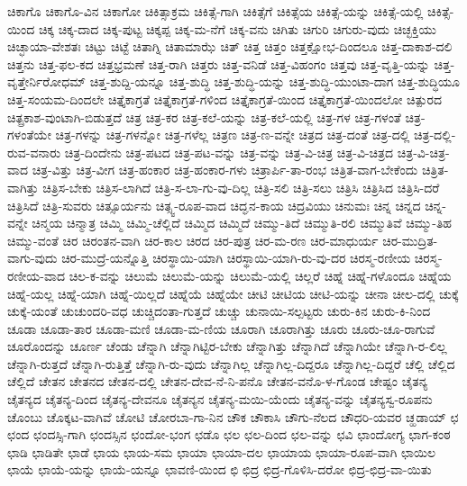 ಚಿಕಾಗೊ
ಚಿಕಾಗೊ-ವಿನ
ಚಿಕಾಗೋ
ಚಿಕಿತ್ಸಾಕ್ರಮ
ಚಿಕಿತ್ಸೆ-ಗಾಗಿ
ಚಿಕಿತ್ಸೆಗೆ
ಚಿಕಿತ್ಸೆಯ
ಚಿಕಿತ್ಸೆ-ಯನ್ನು
ಚಿಕಿತ್ಸೆ-ಯಲ್ಲಿ
ಚಿಕಿತ್ಸೆ-ಯಿಂದ
ಚಿಕ್ಕ
ಚಿಕ್ಕ-ದಾದ
ಚಿಕ್ಕ-ಪುಟ್ಟ
ಚಿಕ್ಕಪ್ಪ
ಚಿಕ್ಕ-ಮ-ನೆಗೆ
ಚಿಕ್ಕ-ವನು
ಚಿಗಿತು
ಚಿಗುರಿ
ಚಿಗುರು-ವುದು
ಚಿಚ್ಛಕ್ತಿಯು
ಚಿಚ್ಛಾಯಾ-ವೇಶತಃ
ಚಿಟ್ಟು
ಚಿಟ್ಟೆ
ಚಿತಾಗ್ನಿ
ಚಿತಾಮಾಝೆ
ಚಿತ್
ಚಿತ್ತ
ಚಿತ್ತಂ
ಚಿತ್ತಕ್ಷೋಭ-ದಿಂದಲೂ
ಚಿತ್ತ-ದಾಕಾಶ-ದಲಿ
ಚಿತ್ತನು
ಚಿತ್ತ-ಫಲ-ಕದ
ಚಿತ್ತಭ್ರಮಣೆ
ಚಿತ್ತ-ರಾಗಿ
ಚಿತ್ತರು
ಚಿತ್ತ-ವನಿಡೆ
ಚಿತ್ತ-ವಿಹಂಗಂ
ಚಿತ್ತವು
ಚಿತ್ತ-ವೃತ್ತಿ-ಯನ್ನು
ಚಿತ್ತ-ವೃತ್ತೇರ್ನಿರೋಧಮ್
ಚಿತ್ತ-ಶುದ್ದಿ-ಯನ್ನೂ
ಚಿತ್ತ-ಶುದ್ಧಿ
ಚಿತ್ತ-ಶುದ್ಧಿ-ಯನ್ನು
ಚಿತ್ತ-ಶುದ್ಧಿ-ಯುಂಟಾ-ದಾಗ
ಚಿತ್ತ-ಶುದ್ಧಿಯೂ
ಚಿತ್ತ-ಸಂಯಮ-ದಿಂದಲೇ
ಚಿತ್ತೈಕಾಗ್ರತೆ
ಚಿತ್ತೈಕಾಗ್ರತೆ-ಗಳಿಂದ
ಚಿತ್ತೈಕಾಗ್ರತೆ-ಯಿಂದ
ಚಿತ್ತೈಕಾಗ್ರತೆ-ಯಿಂದಲೋ
ಚಿತ್ಪುರದ
ಚಿತ್ಪ್ರಕಾಶ-ವುಂಟಾಗಿ-ಬಿಡುತ್ತದೆ
ಚಿತ್ರ
ಚಿತ್ರ-ಕರ
ಚಿತ್ರ-ಕಲೆ-ಯನ್ನು
ಚಿತ್ರ-ಕಲೆ-ಯಲ್ಲಿ
ಚಿತ್ರ-ಗಳ
ಚಿತ್ರ-ಗಳಂತೆ
ಚಿತ್ರ-ಗಳಂತೆಯೇ
ಚಿತ್ರ-ಗಳನ್ನು
ಚಿತ್ರ-ಗಳನ್ನೋ
ಚಿತ್ರ-ಗಳೆಲ್ಲ
ಚಿತ್ರಣ
ಚಿತ್ರ-ಣ-ವನ್ನೇ
ಚಿತ್ರದ
ಚಿತ್ರ-ದಂತೆ
ಚಿತ್ರ-ದಲ್ಲಿ
ಚಿತ್ರ-ದಲ್ಲಿ-ರುವ-ವನಾರು
ಚಿತ್ರ-ದಿಂದೇನು
ಚಿತ್ರ-ಪಟದ
ಚಿತ್ರ-ಪಟ-ವನ್ನು
ಚಿತ್ರ-ವನ್ನು
ಚಿತ್ರ-ವಿ-ಚಿತ್ರ
ಚಿತ್ರ-ವಿ-ಚಿತ್ರದ
ಚಿತ್ರ-ವಿ-ಚಿತ್ರ-ವಾದ
ಚಿತ್ರ-ವಿತ್ತು
ಚಿತ್ರ-ವೀಗ
ಚಿತ್ರ-ಹಂಕಾರ
ಚಿತ್ರ-ಹಂಕಾರ-ಗಳು
ಚಿತ್ರಾರ್ಪಿ-ತಾ-ರಂಭ
ಚಿತ್ರಿತ-ವಾಗ-ಬೇಕೆಂದು
ಚಿತ್ರಿತ-ವಾಗಿತ್ತು
ಚಿತ್ರಿಸ-ಬೇಕು
ಚಿತ್ರಿಸ-ಲಾಗಿದೆ
ಚಿತ್ರಿ-ಸ-ಲಾ-ಗು-ವು-ದಿಲ್ಲ
ಚಿತ್ರಿ-ಸಲಿ
ಚಿತ್ರಿ-ಸಲು
ಚಿತ್ರಿಸಿ
ಚಿತ್ರಿಸಿದ
ಚಿತ್ರಿಸಿ-ದರೆ
ಚಿತ್ರಿಸಿದೆ
ಚಿತ್ರಿ-ಸುವರು
ಚಿತ್ಸೂರ್ಯನು
ಚಿತ್ಸ್ವ-ರೂಪ-ವಾದ
ಚಿದ್ಘನ-ಕಾಯ
ಚಿದ್ರವಿಯು
ಚಿನುಮಃ
ಚಿನ್ನ
ಚಿನ್ನದ
ಚಿನ್ನ-ವನ್ನೇ
ಚಿನ್ಮಯ
ಚಿನ್ಮಾತ್ರ
ಚಿಮ್ಮಿ
ಚಿಮ್ಮಿ-ಚೆಲ್ಲಿದೆ
ಚಿಮ್ಮಿದ
ಚಿಮ್ಮಿದೆ
ಚಿಮ್ಮು-ತಿದೆ
ಚಿಮ್ಮುತಿ-ರಲಿ
ಚಿಮ್ಮುತಿವೆ
ಚಿಮ್ಮು-ತಿಹ
ಚಿಮ್ಮು-ವಂತೆ
ಚಿರ
ಚಿರಂತನ-ವಾಗಿ
ಚಿರ-ಕಾಲ
ಚಿರದ
ಚಿರ-ಪುತ್ರ
ಚಿರ-ಮ-ರಣ
ಚಿರ-ಮಾಧುರ್ಯ
ಚಿರ-ಮುದ್ರಿತ-ವಾಗು-ವುದು
ಚಿರ-ಮುದ್ರೆ-ಯನ್ನೊತ್ತಿ
ಚಿರಸ್ಥಾಯಿ-ಯಾಗಿ
ಚಿರಸ್ಥಾಯಿ-ಯಾಗಿ-ರು-ವು-ದರ
ಚಿರಸ್ಮ-ರಣೀಯ
ಚಿರಸ್ಮ-ರಣೀಯ-ವಾದ
ಚಿಲ-ಕ-ವನ್ನು
ಚಿಲುಮೆ
ಚಿಲುಮೆ-ಯನ್ನು
ಚಿಲುಮೆ-ಯಲ್ಲಿ
ಚಿಲ್ಲರೆ
ಚಿಹ್ನೆ
ಚಿಹ್ನೆ-ಗಳೊಂದೂ
ಚಿಹ್ನೆಯ
ಚಿಹ್ನೆ-ಯಲ್ಲ
ಚಿಹ್ನೆ-ಯಾಗಿ
ಚಿಹ್ನೆ-ಯಿಲ್ಲದೆ
ಚಿಹ್ನೆಯೆ
ಚಿಹ್ನೆಯೇ
ಚೀಟಿ
ಚೀಟಿಯ
ಚೀಟಿ-ಯನ್ನು
ಚೀನಾ
ಚೀಲ-ದಲ್ಲಿ
ಚುಕ್ಕೆ
ಚುಕ್ಕೆ-ಯಂತೆ
ಚುಚುಂದರಿ-ವಧ
ಚುಚ್ಚಿದಂತಾ-ಗುತ್ತದೆ
ಚುಚ್ಚು
ಚುನಾಯಿ-ಸಲ್ಪಟ್ಟರು
ಚುರು-ಕಿನ
ಚುರು-ಕಿ-ನಿಂದ
ಚೂಡಾ
ಚೂಡಾ-ತಾರ
ಚೂಡಾ-ಮಣಿ
ಚೂಡಾ-ಮ-ಣಿಯ
ಚೂರಾಗಿ
ಚೂರಾಗಿತ್ತು
ಚೂರು
ಚೂರು-ಚೂ-ರಾಗುವೆ
ಚೂರೊಂದನ್ನು
ಚೂರ್ಣ
ಚೆಂಡು
ಚೆನ್ನಾಗಿ
ಚೆನ್ನಾಗಿಟ್ಟಿರ-ಬೇಕು
ಚೆನ್ನಾಗಿತ್ತು
ಚೆನ್ನಾಗಿದೆ
ಚೆನ್ನಾಗಿಯೇ
ಚೆನ್ನಾಗಿ-ರ-ಲಿಲ್ಲ
ಚೆನ್ನಾಗಿ-ರುತ್ತದೆ
ಚೆನ್ನಾಗಿ-ರುತ್ತಿತ್ತೆ
ಚೆನ್ನಾಗಿ-ರು-ವುದು
ಚೆನ್ನಾಗಿಲ್ಲ
ಚೆನ್ನಾಗಿಲ್ಲ-ದಿದ್ದರೂ
ಚೆನ್ನಾಗಿಲ್ಲ-ದಿದ್ದರೆ
ಚೆಲ್ಲಿ
ಚೆಲ್ಲಿದ
ಚೆಲ್ಲಿದೆ
ಚೇತನ
ಚೇತನದ
ಚೇತನ-ದಲ್ಲಿ
ಚೇತನ-ದೇವ-ನೆ-ನಿ-ಪನೊ
ಚೇತನ-ವನೊ-ಳ-ಗೊಂಡ
ಚೇಷ್ಟಂ
ಚೈತನ್ಯ
ಚೈತನ್ಯದ
ಚೈತನ್ಯ-ದಿಂದ
ಚೈತನ್ಯ-ದೇವನೂ
ಚೈತನ್ಯನ
ಚೈತನ್ಯ-ಮಯಿ-ಯೆಂದು
ಚೈತನ್ಯ-ವನ್ನು
ಚೈತನ್ಯಸ್ವ-ರೂಪನು
ಚೊಂಬು
ಚೊಕ್ಕಟ-ವಾಗಿವೆ
ಚೋಟಿ
ಚೋರಬಾ-ಗಾ-ನಿನ
ಚೌಕ
ಚೌಕಾಸಿ
ಚೌಗು-ನೆಲದ
ಚೌಧರಿ-ಯವರ
ಚ್ಹಡಾಯ್
ಛ
ಛಂದ
ಛಂದಸ್ಸಿ-ಗಾಗಿ
ಛಂದಸ್ಸಿನ
ಛಂದೋ-ಭಂಗ
ಛಡೊ
ಛಲ
ಛಲ-ದಿಂದ
ಛಲ-ವನ್ನು
ಛವಿ
ಛಾಂದೋಗ್ಯ
ಛಾಗ-ಕಂಠ
ಛಾಡಿ
ಛಾಡಿತೇ
ಛಾಡೆ
ಛಾಯ
ಛಾಯ-ಸಮ
ಛಾಯಾ
ಛಾಯಾ-ದಲ
ಛಾಯಾಯ
ಛಾಯಾ-ರೂಪ-ವಾಗಿ
ಛಾಯಿಲ
ಛಾಯೆ
ಛಾಯೆ-ಯನ್ನು
ಛಾಯೆ-ಯನ್ನೂ
ಛಾವಣಿ-ಯಿಂದ
ಛಿ
ಛಿದ್ರ
ಛಿದ್ರ-ಗೊಳಿಸಿ-ದರೋ
ಛಿದ್ರ-ಛಿದ್ರ-ವಾ-ಯಿತು
